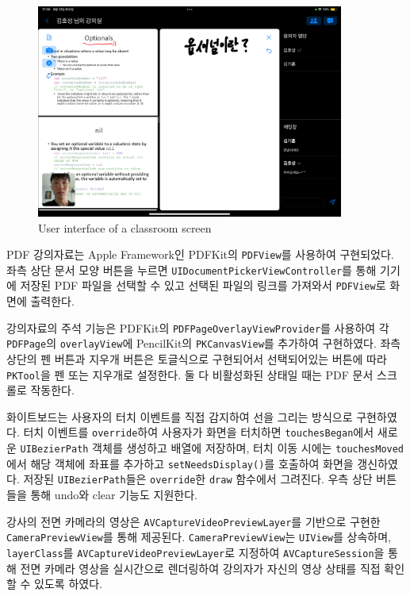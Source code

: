 \documentclass[pdflatex,sn-mathphys-num]{sn-jnl}%
\theoremstyle{thmstyleone}%
\theoremstyle{thmstyletwo}%
\theoremstyle{thmstylethree}%
\begin{document}
\begin{figure}[H]
\centering
\includegraphics[width=0.9\textwidth]{room0.PNG}
\caption{User interface of a classroom screen}\label{fig4}
\end{figure}

\noindent
PDF 강의자료는 Apple Framework인 PDFKit\cite{PDFKit}의 \verb+PDFView+를 사용하여 구현되었다. 좌측 상단 문서 모양 버튼을 누르면 \verb+UIDocumentPickerViewController+를 통해 기기에 저장된 PDF 파일을 선택할 수 있고 선택된 파일의 링크를 가져와서 \verb+PDFView+로 화면에 출력한다.

강의자료의 주석 기능은 PDFKit의 \verb+PDFPageOverlayViewProvider+를 사용하여 각 \verb+PDFPage+의 \verb+overlayView+에 PencilKit\cite{PencilKit}의 \verb+PKCanvasView+를 추가하여 구현하였다. 좌측 상단의 펜 버튼과 지우개 버튼은 토글식으로 구현되어서 선택되어있는 버튼에 따라 \verb+PKTool+을 펜 또는 지우개로 설정한다. 둘 다 비활성화된 상태일 때는 PDF 문서 스크롤로 작동한다.

화이트보드는 사용자의 터치 이벤트를 직접 감지하여 선을 그리는 방식으로 구현하였다. 터치 이벤트를 \verb+override+하여 사용자가 화면을 터치하면 \verb+touchesBegan+에서 새로운 \verb+UIBezierPath+ 객체를 생성하고 배열에 저장하며, 터치 이동 시에는 \verb+touchesMoved+에서 해당 객체에 좌표를 추가하고 \verb+setNeedsDisplay()+를 호출하여 화면을 갱신하였다. 저장된 \verb+UIBezierPath+들은 \verb+override+한 \verb+draw+ 함수에서 그려진다. 우측 상단 버튼들을 통해 undo와 clear 기능도 지원한다.

강사의 전면 카메라의 영상은 \verb+AVCaptureVideoPreviewLayer+를 기반으로 구현한 \verb+CameraPreviewView+를 통해 제공된다. \verb+CameraPreviewView+는 \verb+UIView+를 상속하며, \verb+layerClass+를 \verb+AVCaptureVideoPreviewLayer+로 지정하여 \verb+AVCaptureSession+을 통해 전면 카메라 영상을 실시간으로 렌더링하여 강의자가 자신의 영상 상태를 직접 확인할 수 있도록 하였다.
\end{document}
